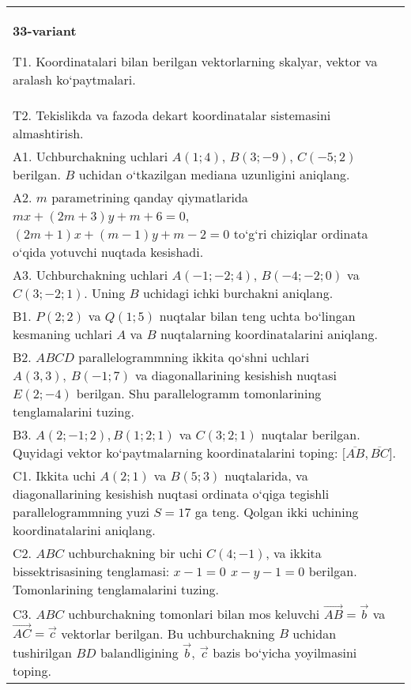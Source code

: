 \documentclass{article}
\begin{document}
\begin{tabular}{m{17cm}}
\textbf{33-variant}
\newline

T1. 
Koordinatalari bilan berilgan vektorlarning skalyar, vektor va aralash ko‘paytmalari. \\
T2. Tekislikda va fazoda dekart koordinatalar sistemasini almashtirish.
 \\
A1. 
Uchburchakning uchlari $A (1;4) $, $B (3;-9) $, $C (-5;2) $
berilgan. $B$ uchidan o‘tkazilgan mediana uzunligini aniqlang.
 \\
A2. 
$m$ parametrining qanday qiymatlarida
$mx+ (2m+3) y+m+6=0$, $ (2m+1) x+ (m-1) y+m-2=0$ to‘g‘ri chiziqlar ordinata
o‘qida yotuvchi nuqtada kesishadi.
 \\
A3. 
Uchburchakning uchlari
$A (- 1; - 2;4) $, $B (- 4; - 2;0) $ va $C (3; -2;1) $. Uning $B$ uchidagi
ichki burchakni aniqlang.
 \\
B1. 
\(P (2;2) \) va \(Q (1;5) \) nuqtalar bilan teng uchta
bo‘lingan kesmaning uchlari $A$ va $B$ nuqtalarning
koordinatalarini aniqlang.
 \\
B2. 
$ABCD$ parallelogrammning ikkita qo‘shni uchlari
\(A (3,3),\ B (-1;7) \) va diagonallarining kesishish nuqtasi
\(E (2;-4) \) berilgan. Shu parallelogramm tomonlarining tenglamalarini
tuzing.
 \\
B3. 
$A (2; -1;2),B (1;2; 1) $ va $C (3;2;1)$ nuqtalar berilgan. Quyidagi vektor ko‘paytmalarning koordinatalarini toping:
$\lbrack\overline{AB},\overline{BC}\rbrack$.
 \\
C1. 
Ikkita uchi \(A (2;1) \) va \(B (5; 3) \) nuqtalarida, va
diagonallarining kesishish nuqtasi ordinata o‘qiga tegishli
parallelogrammning yuzi \(S = 17\) ga teng. Qolgan ikki uchining
koordinatalarini aniqlang. \\
C2. 
$ABC$ uchburchakning bir uchi \(C (4; - 1) \), va
ikkita bissektrisasining tenglamasi: \(x - 1 = 0\,\ x - y - 1 = 0\)
berilgan. Tomonlarining tenglamalarini tuzing.
 \\
C3. 
\(ABC\) uchburchakning tomonlari bilan mos keluvchi \(\vec{AB} = \vec{b}\) va \(\vec{AC} = \vec{c}\) vektorlar berilgan. Bu uchburchakning \(B\) uchidan tushirilgan \(BD\) balandligining \(\vec{b},\ \vec{c}\) bazis bo‘yicha yoyilmasini toping.
 \\

\end{tabular}
\vspace{1cm}
\end{document}
